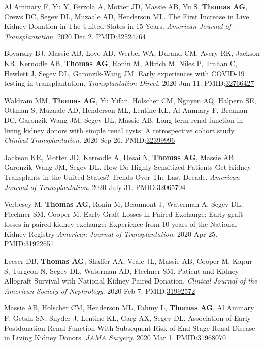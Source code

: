 \documentclass[10pt]{article}
\makeatletter
\newlength{\bibhang}
\newlength{\bibsep}
 {\@listi \global\bibsep\itemsep \global\advance\bibsep by\parsep}
\newenvironment{bibenum*}
  {\renewcommand\labelenumi{[\theenumi]}%
   \etaremune[
     topsep=0pt,
     itemsep=\bibsep,
     parsep=0pt,partopsep=0pt,
     itemindent=-\bibhang,
     leftmargin={\bibhang+\widthof{[999]}}]}
  {\endetaremune}
\newcommand{\pmid}[1]{PMID:\href{https://www.ncbi.nlm.nih.gov/pubmed/#1}{#1}}
\makeatother
\begin{document}
\begin{bibenum*}
\item Al Ammary F, Yu Y, Ferzola A, Motter JD, Massie AB, Yu S,
  \textbf{Thomas AG}, Crews DC, Segev DL, Muzaale AD, Henderson ML.
  The First Increase in Live Kidney Donation in The United States
  in 15 Years.
  \emph{American Journal of Transplantation}. 2020 Dec 2.
  \pmid{32524764} 

\item Boyarsky BJ, Massie AB, Love AD, Werbel WA, Durand CM, Avery RK,
  Jackson KR, Kernodle AB, \textbf{Thomas AG}, Ronin M,
  Altrich M, Niles P, Trahan C, Hewlett J, Segev DL, Garonzik-Wang JM.
  Early experiences with COVID-19 testing in transplantation.
  \emph{Transplantation Direct}. 2020 Jun 11.
  \pmid{32766427} 

\item Waldram MM\dag, \textbf{Thomas AG\dag}, Yu Yifan, Holscher CM,
  Nguyen AQ, Halpern SE, Ottman S, Muzaale AD, Henderson ML, Lentine KL,
  Al Ammary F, Brennan DC, Garonzik-Wang JM, Segev DL, Massie AB.
  Long-term renal function in living kidney donors with simple renal cysts:
  A retrospective cohort study.
  \emph{Clinical Transplantation}. 2020 Sep 26.
  \pmid{32399996} 

\item Jackson KR\dag, Motter JD\dag, Kernodle A, Desai N, \textbf{Thomas AG},
 Massie AB, Garonzik Wang JM, Segev DL.
 How Do Highly Sensitized Patients Get Kidney Transplants in the
 United States? Trends Over The Last Decade.
 \emph{American Journal of Transplantation}. 2020 July 31.
 \pmid{32065704} 

\item Verbesey M, \textbf{Thomas AG}, Ronin M, Beaumont J, Waterman A,
  Segev DL, Flechner SM, Cooper M. Early Graft Losses in Paired Exchange:
  Early graft losses in paired kidney exchange: Experience from 
  10 years of the National Kidney Registry 
  \emph{American Journal of Transplantation}. 2020 Apr 25.
  \pmid{31922651} 

\item Leeser DB, \textbf{Thomas AG}, Shaffer AA, Veale JL,
  Massie AB, Cooper M,
  Kapur S, Turgeon N, Segev DL, Waterman AD, Flechner SM.
  Patient and Kidney Allograft Survival with National Kidney Paired Donation.
  \emph{Clinical Journal of the American Society of Nephrology}. 2020 Feb 7.
  \pmid{31992572} 

\item Massie AB, Holscher CM, Henderson ML, Fahmy L, \textbf{Thomas AG},
  Al Ammary F, Getsin SN, Snyder J, Lentine KL, Garg AX, Segev DL.
  Association of Early Postdonation Renal Function With Subsequent 
  Risk of End-Stage Renal Disease in Living Kidney Donors.
 \emph{JAMA Surgery}. 2020 Mar 1.
 \pmid{31968070} 


\end{bibenum*}
\end{document}
